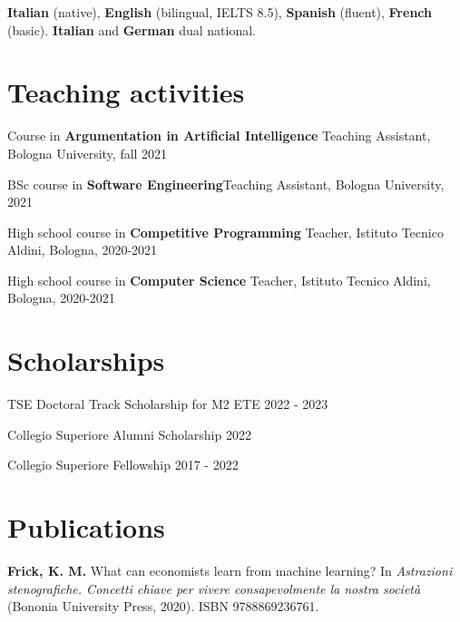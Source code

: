 \documentclass[11pt, a4paper]{article}
\begin{document}
 \textbf{Italian} (native), \textbf{English} (bilingual, IELTS 8.5),
  \textbf{Spanish} (fluent), \textbf{French} (basic). \textbf{Italian} and \textbf{German} dual national.

\section*{Teaching activities}

  Course in \textbf{Argumentation in Artificial Intelligence} \hfill Teaching Assistant, Bologna University, fall 2021


  BSc course in \textbf{Software Engineering}\hfill Teaching Assistant, Bologna University, 2021


  High school course in \textbf{Competitive Programming} \hfill Teacher, Istituto Tecnico Aldini, Bologna, 2020-2021


  High school course in \textbf{Computer Science} \hfill Teacher, Istituto
  Tecnico Aldini, Bologna, 2020-2021


\section*{Scholarships}

TSE Doctoral Track Scholarship for M2 ETE \hfill 2022 - 2023


Collegio Superiore Alumni Scholarship \hfill 2022


Collegio Superiore Fellowship \hfill 2017 - 2022

\section*{Publications}

\textbf{Frick, K. M.} What can economists learn from machine learning? In
\emph{Astrazioni stenografiche. Concetti chiave per vivere consapevolmente la nostra società} (Bononia University Press, 2020). ISBN 9788869236761.
\end{document}
